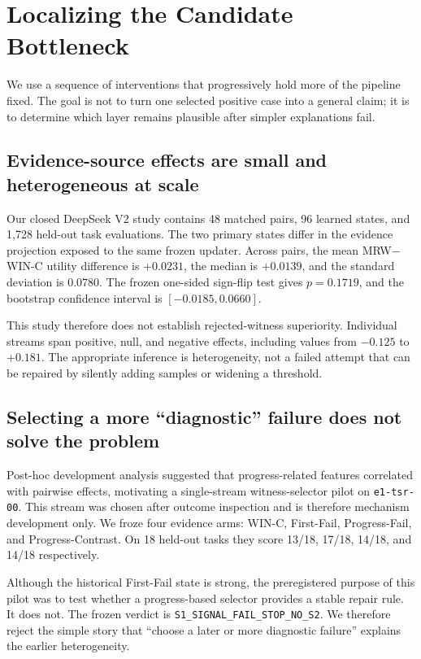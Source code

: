\section{Localizing the Candidate Bottleneck}
\label{sec:localization}

We use a sequence of interventions that progressively hold more of the pipeline fixed. The goal is not to turn one selected positive case into a general claim; it is to determine which layer remains plausible after simpler explanations fail.

\subsection{Evidence-source effects are small and heterogeneous at scale}
Our closed DeepSeek V2 study contains 48 matched pairs, 96 learned states, and 1,728 held-out task evaluations. The two primary states differ in the evidence projection exposed to the same frozen updater. Across pairs, the mean MRW$-$WIN-C utility difference is $+0.0231$, the median is $+0.0139$, and the standard deviation is $0.0780$. The frozen one-sided sign-flip test gives $p=0.1719$, and the bootstrap confidence interval is $[-0.0185,0.0660]$.

This study therefore does not establish rejected-witness superiority. Individual streams span positive, null, and negative effects, including values from $-0.125$ to $+0.181$. The appropriate inference is heterogeneity, not a failed attempt that can be repaired by silently adding samples or widening a threshold.

\subsection{Selecting a more ``diagnostic'' failure does not solve the problem}
Post-hoc development analysis suggested that progress-related features correlated with pairwise effects, motivating a single-stream witness-selector pilot on \texttt{e1-tsr-00}. This stream was chosen after outcome inspection and is therefore mechanism development only. We froze four evidence arms: WIN-C, First-Fail, Progress-Fail, and Progress-Contrast. On 18 held-out tasks they score 13/18, 17/18, 14/18, and 14/18 respectively.

Although the historical First-Fail state is strong, the preregistered purpose of this pilot was to test whether a progress-based selector provides a stable repair rule. It does not. The frozen verdict is \texttt{S1\_SIGNAL\_FAIL\_STOP\_NO\_S2}. We therefore reject the simple story that ``choose a later or more diagnostic failure'' explains the earlier heterogeneity.

